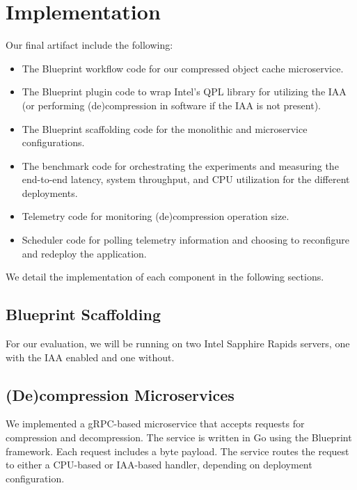 \section{Implementation}

Our final artifact include the following:
\begin{itemize}
    \item The Blueprint workflow code for our compressed object cache microservice.
    \item The Blueprint plugin code to wrap Intel's QPL library for utilizing the IAA (or performing (de)compression in software if the IAA is not present).
    \item The Blueprint scaffolding code for the monolithic and microservice configurations.
    \item The benchmark code for orchestrating the experiments and measuring the end-to-end latency, system throughput, and CPU utilization for the different deployments.
    \item Telemetry code for monitoring (de)compression operation size.
    \item Scheduler code for polling telemetry information and choosing to reconfigure and redeploy the application.
\end{itemize}

We detail the implementation of each component in the following sections.

\subsection{Blueprint Scaffolding}


For our evaluation, we will be running on two Intel Sapphire Rapids servers, one with the IAA enabled and one without.

\subsection{(De)compression Microservices}

We implemented a gRPC-based microservice that accepts requests for compression and decompression.
The service is written in Go using the Blueprint framework.
Each request includes a byte payload.
The service routes the request to either a CPU-based or IAA-based handler, depending on deployment configuration.

